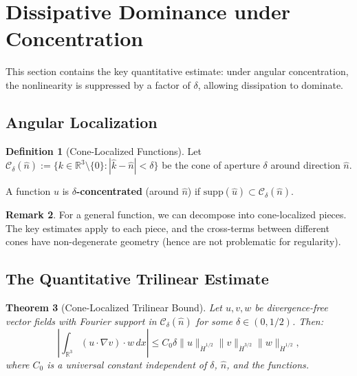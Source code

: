 \documentclass[11pt]{article}
\newtheorem{theorem}{Theorem}[section]
\theoremstyle{definition}
\newtheorem{definition}[theorem]{Definition}
\newtheorem{remark}[theorem]{Remark}
\newcommand{\R}{\mathbb{R}}
\begin{document}
\section{Dissipative Dominance under Concentration}

This section contains the key quantitative estimate: under angular concentration, the nonlinearity is suppressed by a factor of $\delta$, allowing dissipation to dominate.

\subsection{Angular Localization}

\begin{definition}[Cone-Localized Functions]
Let $\mathcal{C}_\delta(\hat{n}) := \{k \in \R^3 \setminus \{0\} : |\hat{k} - \hat{n}| < \delta\}$ be the cone of aperture $\delta$ around direction $\hat{n}$.

A function $u$ is \textbf{$\delta$-concentrated} (around $\hat{n}$) if $\text{supp}(\hat{u}) \subset \mathcal{C}_\delta(\hat{n})$.
\end{definition}

\begin{remark}
For a general function, we can decompose into cone-localized pieces. The key estimates apply to each piece, and the cross-terms between different cones have non-degenerate geometry (hence are not problematic for regularity).
\end{remark}

\subsection{The Quantitative Trilinear Estimate}

\begin{theorem}[Cone-Localized Trilinear Bound]\label{thm:trilinear}
Let $u, v, w$ be divergence-free vector fields with Fourier support in $\mathcal{C}_\delta(\hat{n})$ for some $\delta \in (0, 1/2)$. Then:
\begin{equation}\label{eq:trilinear-main}
\left| \int_{\R^3} (u \cdot \nabla v) \cdot w \, dx \right| \leq C_0 \delta \|u\|_{\dot{H}^{1/2}} \|v\|_{\dot{H}^{3/2}} \|w\|_{\dot{H}^{1/2}},
\end{equation}
where $C_0$ is a universal constant independent of $\delta$, $\hat{n}$, and the functions.
\end{theorem}
\end{document}
